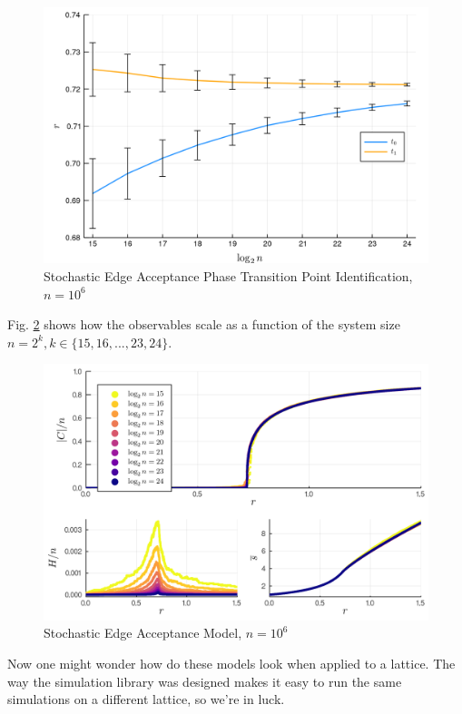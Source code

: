 \begin{figure}[H]
	\centering
	\includegraphics[width=350pt, clip]{images/delta_scaling_2.png}
	\caption{Stochastic Edge Acceptance Phase Transition Point Identification, $n = 10^6$}
	\label{fig:delta_scaling_2}
\end{figure}

Fig. \ref{fig:Network_stochastic_edge_acceptance_observables} shows how the observables scale as a function of the system size $n = 2^k, k \in \{15, 16, ..., 23, 24\}$.

\begin{figure}[H]
	\centering
	\includegraphics[width=350pt, clip]{images/Network_stochastic_edge_acceptance_observables.png}
	\caption{Stochastic Edge Acceptance Model, $n = 10^6$}
	\label{fig:Network_stochastic_edge_acceptance_observables}
\end{figure}

Now one might wonder how do these models look when applied to a lattice.
The way the simulation library was designed makes it easy to run the same simulations on a different lattice, so we're in luck.


